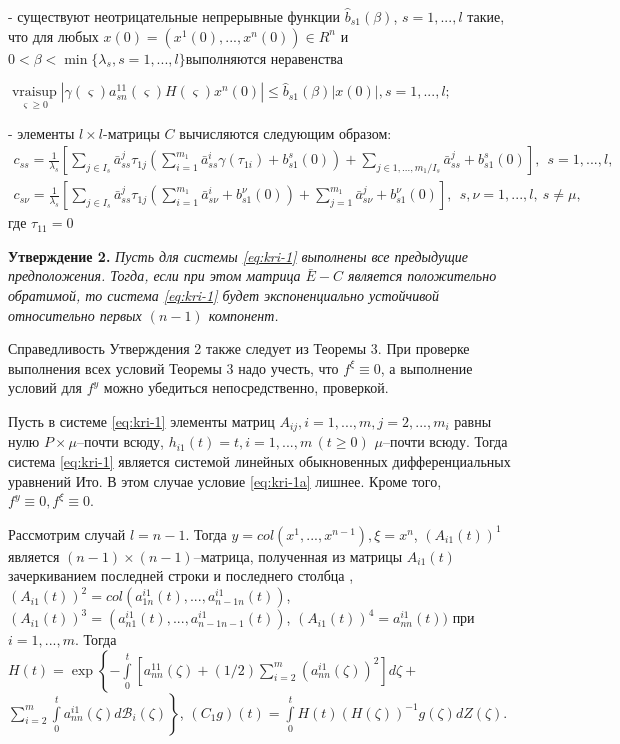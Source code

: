 - существуют неотрицательные непрерывные функции  $\hat
b_{s1}(\beta)$, $s= 1, ..., l$ такие,  что для любых  $ x (0) = (x^1
(0), ..., x^n(0)) \in R^n$  и $0 < \beta < \min \{\lambda _s, s = 1,
..., l \}$выполняются неравенства\\
\begin{center}
$\mathrel {\mathop
 {vrai \sup}\limits _{\varsigma \geq 0}} \left |\gamma (\varsigma )a^{11}_{sn}(\varsigma )
H(\varsigma)x^n(0)\right | \leq \hat b_{s1}(\beta)|x(0)|, s =
1,...,l;$
\end{center}

- элементы $l\times l$-матрицы $C$ вычисляются следующим образом:
$$
\begin{array}{crl}
c_{ss} = \frac{1}{\lambda _s } \left [\sum \limits_{j \in I_s} \bar
a^{j}_{ss}\tau _{1j}
 \left (\sum \limits_{i=1}^{m_1}\bar a^{i}_{ss} \gamma (\tau
 _{1i})
 + b^s_{s1}(0)\right )
 +\sum\limits_{j \in {1,...,m_1}/ I_s} \bar a^{j}_{ss} +
b^s_{s1}(0)\right ], \ \  s = 1,...,l,
\end{array}
$$
$$
\begin{array}{crl}
c_{s\nu} = \frac{1}{\lambda _s } \left [\sum \limits_{j \in I_s}
\bar a^{j}_{ss}\tau _{1j}
 \left (\sum \limits_{i=1}^{m_1}\bar a^{i}_{s\nu} + b^\nu_{s1}(0)\right )
+\sum\limits_{j =1}^{m_1} \bar a^{j}_{s\nu} + b^\nu_{s1}(0)\right ],
\ \ s,\nu = 1,...,l, \ s \neq \mu,
\end{array}
$$
где $\tau _{11} = 0$


\textbf {Утверждение 2.} {\it Пусть для системы \eqref{eq:kri-1} выполнены все
предыдущие предположения. Тогда, если при этом матрица $\bar E - C$
является положительно обратимой, то система \eqref{eq:kri-1} будет
экспоненциально устойчивой относительно первых $(n-1)$ компонент.}

Справедливость Утверждения 2 также следует из Теоремы 3. При
проверке выполнения всех условий Теоремы 3  надо учесть, что $f^\xi
\equiv 0$, а выполнение условий для $f^y $ можно убедиться
непосредственно, проверкой.

Пусть в системе \eqref{eq:kri-1} элементы матриц $A_{ij}, i = 1, ..., m, j = 2,
..., m_i$ равны нулю $P\times\mu$--почти всюду,   $h_{i1}(t) = t, i
= 1, ..., m \, (t \geq 0)$ $\mu $--почти всюду. Тогда система \eqref{eq:kri-1}
является системой линейных обыкновенных дифференциальных уравнений
Ито. В этом случае условие \eqref{eq:kri-1a} лишнее. Кроме того, $f^y \equiv 0,
f^\xi \equiv 0$.

Рассмотрим случай  $l = n-1$. Тогда $y = col(x^1,...,x^{n-1}), \xi =
x^n$, $(A_{i1}(t))^1$ является $(n-1)\times (n-1)$--матрица,
полученная из матрицы $A_{i1}(t)$ зачеркиванием последней строки и
последнего столбца , $(A_{i1}(t))^2 =
col(a^{i1}_{1n}(t),...,a^{i1}_{n-1 n}(t))$, $(A_{i1}(t))^3 =
(a^{i1}_{n1}(t),...,a^{i1}_{n-1n-1}(t))$, $(A_{i1}(t))^4 =
a^{i1}_{nn}(t))$ при $i = 1,...,m $. Тогда $H(t) = \exp \left
\{-\int \limits _{0}^t [a^{11}_{nn}(\zeta) + (1/2)\sum \limits
_{i=2}^m (a^{i1}_{nn}(\zeta))^2]d\zeta  + \right .$ $\left . \sum
\limits_{i=2}^m \int \limits
 _0^t a^{i1}_{nn}(\zeta)d\mathcal B_i(\zeta)\right \}$, $(C_1g)(t) = \int \limits
_{0}^tH(t)(H(\zeta))^{-1}g(\zeta)dZ(\zeta)$.

